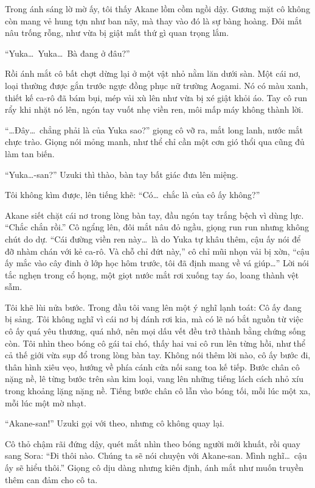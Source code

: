 \documentclass[../main.tex]{subfiles}
\begin{document}
Trong ánh sáng lờ mờ ấy, tôi thấy Akane lồm cồm ngồi dậy. Gương mặt cô không còn mang vẻ hung tợn như ban nãy, mà thay vào đó là sự bàng hoàng. Đôi mắt nâu trống rỗng, như vừa bị giật mất thứ gì quan trọng lắm.

``Yuka\dots\ Yuka\dots\ Bà đang ở đâu?''

Rồi ánh mắt cô bất chợt dừng lại ở một vật nhỏ nằm lăn dưới sàn. Một cái nơ, loại thường được gắn trước ngực đồng phục nữ trường Aogami. Nó có màu xanh, thiết kế ca-rô đã bám bụi, mép vải xù lên như vừa bị xé giật khỏi áo. Tay cô run rẩy khi nhặt nó lên, ngón tay vuốt nhẹ viền ren, môi mấp máy không thành lời.


``\dots Đây\dots\ chẳng phải là của Yuka sao?'' giọng cô vỡ ra, mắt long lanh, nước mắt chực trào. Giọng nói mỏng manh, như thể chỉ cần một cơn gió thổi qua cũng đủ làm tan biến.

``Yuka\dots-san?'' Uzuki thì thào, bàn tay bất giác đưa lên miệng.

Tôi không kìm được, lên tiếng khẽ: ``Có\dots\ chắc là của cô ấy không?''

Akane siết chặt cái nơ trong lòng bàn tay, đầu ngón tay trắng bệch vì dùng lực. ``Chắc chắn rồi.'' Cô ngẩng lên, đôi mắt nâu đỏ ngầu, giọng run run nhưng không chút do dự. ``Cái đường viền ren này\dots\ là do Yuka tự khâu thêm, cậu ấy nói để đỡ nhàm chán với kẻ ca-rô. Và chỗ chỉ đứt này,'' cô chỉ mũi nhọn vải bị xờn, ``cậu ấy mắc vào cây đinh ở lớp học hôm trước, tôi đã định mang về vá giúp\dots'' Lời nói tắc nghẹn trong cổ họng, một giọt nước mắt rơi xuống tay áo, loang thành vệt sẫm.

Tôi khẽ lùi nửa bước. Trong đầu tôi vang lên một ý nghĩ lạnh toát: Cô ấy đang bị sảng. Tôi không nghĩ vì cái nơ bị đánh rơi kia, mà có lẽ nó bắt nguồn từ việc cô ấy quá yêu thương, quá nhớ, nên mọi dấu vết đều trở thành bằng chứng sống còn. Tôi nhìn theo bóng cô gái tai chó, thấy hai vai cô run lên từng hồi, như thể cả thế giới vừa sụp đổ trong lòng bàn tay. Không nói thêm lời nào, cô ấy bước đi, thân hình xiêu vẹo, hướng về phía cánh cửa nối sang toa kế tiếp. Bước chân cô nặng nề, lê từng bước trên sàn kim loại, vang lên những tiếng lách cách nhỏ xíu trong khoảng lặng nặng nề. Tiếng bước chân cô lẫn vào bóng tối, mỗi lúc một xa, mỗi lúc một mờ nhạt.

``Akane-san!'' Uzuki gọi với theo, nhưng cô không quay lại.

Cô thỏ chậm rãi đứng dậy, quét mắt nhìn theo bóng người mới khuất, rồi quay sang Sora: ``Đi thôi nào. Chúng ta sẽ nói chuyện với Akane-san. Mình nghĩ\dots\ cậu ấy sẽ hiểu thôi.'' Giọng cô dịu dàng nhưng kiên định, ánh mắt như muốn truyền thêm can đảm cho cô ta.
\end{document}
